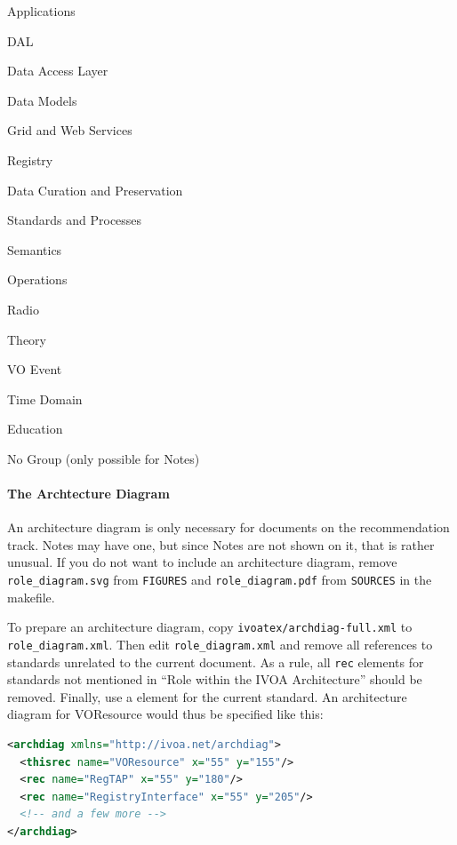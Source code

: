 \documentclass[11pt,a4paper]{ivoa}
\begin{document}
\begin{compactitem}
\item Applications
\item DAL
\item Data Access Layer
\item Data Models
\item Grid and Web Services
\item Registry
\item Data Curation and Preservation
\item Standards and Processes
\item Semantics
\item Operations
\item Radio
\item Theory
\item VO Event
\item Time Domain
\item Education
\item No Group (only possible for Notes)
\end{compactitem}


\paragraph{The Archtecture Diagram}

An architecture diagram is only 
necessary for documents on the recommendation track.  Notes may have
one, but since Notes are not shown on it, that is rather
unusual.  If you do not want to include an architecture diagram, remove
\texttt{role\_diagram.svg} from \texttt{FIGURES} and
\texttt{role\_diagram.pdf} from \texttt{SOURCES} in the makefile.

To prepare an architecture diagram, copy
\texttt{ivoatex/archdiag-full.xml} to \texttt{role\_diagram.xml}.  Then edit
\texttt{role\_diagram.xml} and remove all references to standards unrelated
to the current document.  As a rule, all \texttt{rec} elements for
standards not mentioned in
``Role within the IVOA Architecture'' should be removed.  Finally, use a
 element for the current standard.  An architecture
diagram for VOResource would thus be specified like this:

\begin{lstlisting}[language=XML,basicstyle=\footnotesize]
<archdiag xmlns="http://ivoa.net/archdiag">
  <thisrec name="VOResource" x="55" y="155"/>
  <rec name="RegTAP" x="55" y="180"/>
  <rec name="RegistryInterface" x="55" y="205"/>
  <!-- and a few more -->
</archdiag>
\end{lstlisting}
\end{document}
